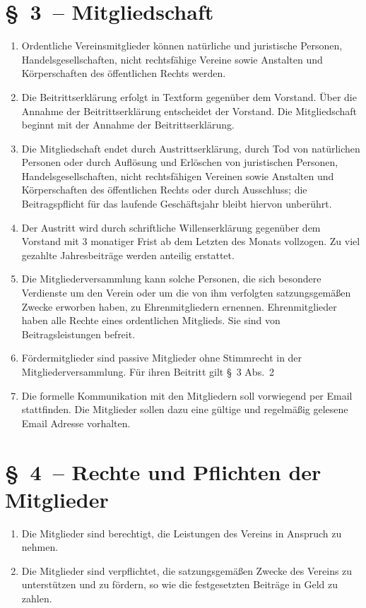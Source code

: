 \documentclass[11pt,DIV12]{scrartcl}
\begin{document}
\section*{§~3~-- Mitgliedschaft}
\begin{enumerate}
\item Ordentliche Vereinsmitglieder können natürliche und juristische Personen, Handelsgesellschaften, nicht rechtsfähige Vereine sowie Anstalten und Körperschaften des öffentlichen Rechts werden.
\item Die Beitrittserklärung erfolgt in Textform gegenüber dem Vorstand. Über die Annahme der Beitrittserklärung entscheidet der Vorstand. Die Mitgliedschaft beginnt mit der Annahme der Beitrittserklärung.
\item Die Mitgliedschaft endet durch Austrittserklärung, durch Tod von natürlichen Personen oder durch Auflösung und Erlöschen von juristischen Personen, Handelsgesellschaften, nicht rechtsfähigen Vereinen sowie Anstalten und Körperschaften des öffentlichen Rechts oder durch Ausschluss; die Beitragspflicht für das laufende Geschäftsjahr bleibt hiervon unberührt.
\item Der Austritt wird durch schriftliche Willenserklärung gegenüber dem Vorstand mit 3 monatiger Frist ab dem Letzten des Monats vollzogen. Zu viel gezahlte Jahresbeiträge werden anteilig erstattet.
\item Die Mitgliederversammlung kann solche Personen, die sich besondere Verdienste um den Verein oder um die von ihm verfolgten satzungsgemäßen Zwecke erworben haben, zu Ehrenmitgliedern ernennen. Ehrenmitglieder haben alle Rechte eines ordentlichen Mitglieds. Sie sind von Beitragsleistungen befreit.
\item Fördermitglieder sind passive Mitglieder ohne Stimmrecht in der Mitgliederversammlung. Für ihren Beitritt gilt §~3 Abs.~2
\item Die formelle Kommunikation mit den Mitgliedern soll vorwiegend per Email stattfinden. Die Mitglieder sollen dazu eine gültige und regelmäßig gelesene Email Adresse vorhalten.
\end{enumerate}

\section*{§~4~-- Rechte und Pflichten der Mitglieder}
\begin{enumerate}
\item Die Mitglieder sind berechtigt, die Leistungen des Vereins in Anspruch zu nehmen.
\item Die Mitglieder sind verpflichtet, die satzungsgemäßen Zwecke des Vereins zu unterstützen und zu fördern, so wie die festgesetzten Beiträge in Geld zu zahlen.
\end{enumerate}
\end{document}
